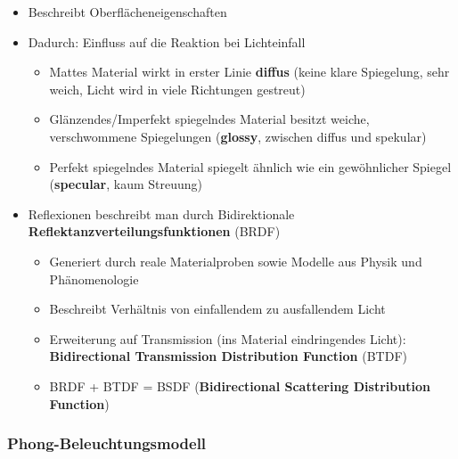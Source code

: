 \documentclass[10pt,a4paper]{article}
\begin{document}
	\begin{itemize}
		\item Beschreibt Oberflächeneigenschaften
		\item Dadurch: Einfluss auf die Reaktion bei Lichteinfall
		\begin{itemize}
			\item Mattes Material wirkt in erster Linie \textbf{diffus} (keine klare Spiegelung, sehr weich, Licht wird in viele Richtungen gestreut)
			\item Glänzendes/Imperfekt spiegelndes Material besitzt weiche, verschwommene Spiegelungen (\textbf{\glqq glossy\grqq}, zwischen diffus und spekular)
			\item Perfekt spiegelndes Material spiegelt ähnlich wie ein gewöhnlicher Spiegel (\textbf{\glqq specular\grqq}, kaum Streuung)
		\end{itemize}
		\item Reflexionen beschreibt man durch Bidirektionale \textbf{Reflektanzverteilungsfunktionen} (BRDF)
		\begin{itemize}
			\item Generiert durch reale Materialproben sowie Modelle aus Physik und Phänomenologie
			\item Beschreibt Verhältnis von einfallendem zu ausfallendem Licht
			\item Erweiterung auf Transmission (ins Material eindringendes Licht): \textbf{Bidirectional Transmission Distribution Function} (BTDF)
			\item BRDF + BTDF = BSDF (\textbf{Bidirectional Scattering Distribution Function})
		\end{itemize}
	\end{itemize}

	\subsubsection{Phong-Beleuchtungsmodell}
	\label{ssub:phong_beleuchtungsmodell}
	
\end{document}
